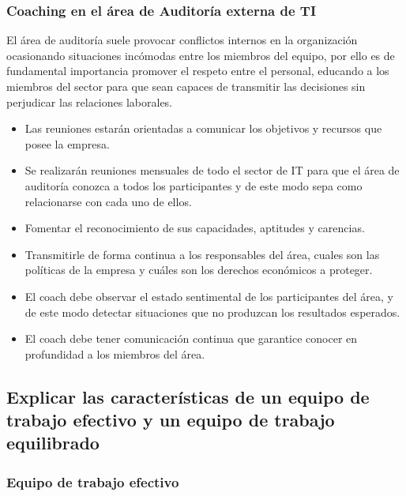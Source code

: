         \subsubsection{Coaching en el área de Auditoría externa de TI}        
        El área de auditoría  suele provocar conflictos internos en la organización ocasionando situaciones incómodas entre los miembros del equipo, por ello es de fundamental importancia promover el respeto entre el personal, educando a los miembros del sector para que sean capaces de transmitir las decisiones sin perjudicar las relaciones laborales.
        \begin{itemize}
	        \item Las reuniones estarán orientadas a comunicar los objetivos y recursos que posee la empresa.
            \item Se realizarán reuniones mensuales de todo el sector de IT para que el área de auditoría conozca a todos los participantes y de este modo sepa como relacionarse con cada uno de ellos.
            \item Fomentar el reconocimiento de sus capacidades, aptitudes y carencias.
            \item Transmitirle de forma continua a los responsables del área, cuales son las políticas de la empresa y cuáles son los derechos económicos a proteger.
            \item  El coach debe observar el estado sentimental de los participantes del área, y de este modo detectar situaciones que no produzcan los resultados esperados.
            \item El coach debe tener comunicación continua que garantice conocer en profundidad a los miembros del área.
            
        \end{itemize}



\newpage

    \subsection{Explicar las \textbf{características de un equipo de trabajo efectivo y un equipo de trabajo equilibrado}} %
    

\subsubsection{Equipo de trabajo efectivo}

